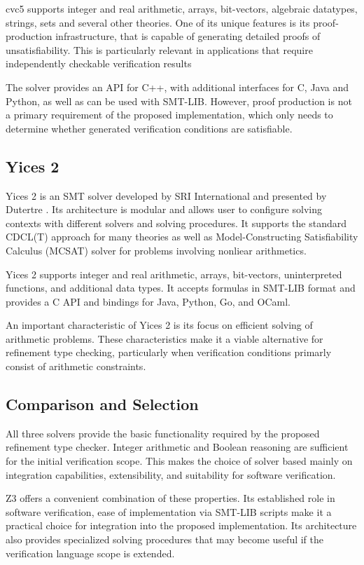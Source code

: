 cvc5 supports integer and real arithmetic, arrays, bit-vectors, algebraic datatypes, strings, sets and several
other theories. One of its unique features is its proof-production infrastructure, that is capable of generating
detailed proofs of unsatisfiability. This is particularly relevant in applications that require independently 
checkable verification results

The solver provides an API for C++, with additional interfaces for C, Java and Python, as well as can be
used with SMT-LIB. However, proof production is not a primary requirement of the proposed implementation,
which only needs to determine whether generated verification conditions are satisfiable.

\subsection{Yices 2}
Yices 2 is an SMT solver developed by SRI International and presented by Dutertre \cite{dutertreYices222014}.
Its architecture is modular and allows user to configure solving contexts with different solvers and solving procedures.
It supports the standard CDCL(T) approach for many theories as well as Model-Constructing Satisfiability Calculus
(MCSAT) solver for problems involving nonliear arithmetics.

Yices 2 supports integer and real arithmetic, arrays, bit-vectors, uninterpreted functions, and additional data types.
It accepts formulas in SMT-LIB format and provides a C API and bindings for Java, Python, Go, and OCaml.

An important characteristic of Yices 2 is its focus on efficient solving of arithmetic problems. These characteristics
make it a viable alternative for refinement type checking, particularly when verification conditions primarly
consist of arithmetic constraints.

\subsection{Comparison and Selection}
All three solvers provide the basic functionality required by the proposed refinement type checker.
Integer arithmetic and Boolean reasoning are sufficient for the initial verification scope.
This makes the choice of solver based mainly on integration capabilities, extensibility, and suitability
for software verification.

Z3 offers a convenient combination of these properties. Its established role in software verification, ease of implementation
via SMT-LIB scripts make it a practical choice for integration into the proposed implementation. Its architecture 
also provides specialized solving procedures that may become useful if the verification language 
scope is extended.

